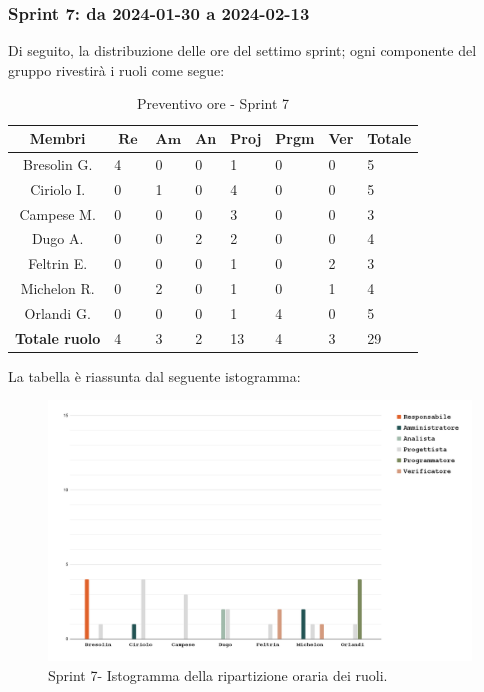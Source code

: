 \documentclass[10pt, a4paper]{article}
\begin{document}
{{{{{{{{{{{{{{\subsubsection{Sprint 7: da 2024-01-30 a 2024-02-13}
Di seguito, la distribuzione delle ore del settimo sprint; ogni componente del gruppo rivestirà i ruoli come segue:
\begin{table}[H]
\begin{tabularx}{\textwidth}{c|X|X|X|X|X|X|X}
    \textbf{Membri} & $\operatorname{\textbf{Re}}$ & $\mathrm{\textbf{Am}}$ & \textbf{An} & \textbf{Proj} & \textbf{Prgm} & \textbf{Ver} & \textbf{Totale} \\
        \hline Bresolin G. & \cellcolor{primarycolor}4 & 0 & 0 & 1 & 0 & 0 & 5 \\
        \hline Ciriolo I.  & 0 & 1 & 0 & \cellcolor{primarycolor}4 & 0 & 0 & 5 \\
        \hline Campese M.  & 0 & 0 & 0 & \cellcolor{primarycolor}3 & 0 & 0 & 3 \\
        \hline Dugo A.     & 0 & 0 & \cellcolor{primarycolor}2 & 2 & 0 & 0 & 4 \\
        \hline Feltrin E.  & 0 & 0 & 0 & 1 & 0 & \cellcolor{primarycolor}2 & 3 \\
        \hline Michelon R. & 0 & \cellcolor{primarycolor}2 & 0 & 1 & 0 & 1 & 4 \\
        \hline Orlandi G.  & 0 & 0 & 0 & 1 & \cellcolor{primarycolor}4 & 0 & 5 \\
        \hline
        \textbf{Totale ruolo} & 4 & 3 & 2 & 13 & 4 & 3 & 29 
    \end{tabularx}
    \caption{Preventivo ore - Sprint 7}
    \end{table}

La tabella è riassunta dal seguente istogramma:
 \begin{figure}[H]
        \centering        
        \includegraphics[width=15.5cm]{istogrammi/istogramma_7_periodo.png}
        \caption{Sprint 7- Istogramma della ripartizione oraria dei ruoli. }
    \end{figure}

}}}}}}}}}}}}}}
\end{document}
